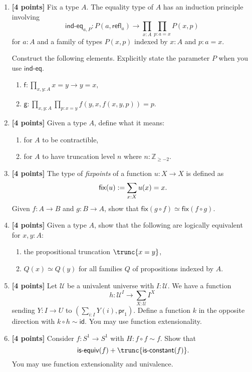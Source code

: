 \documentclass[11pt]{article}
\DeclarePairedDelimiter\trunc\lVert\rVert
\newcommand{\U}{\mathcal{U}}
\newcommand{\Z}{\mathbb{Z}}
\newcommand{\id}{\mathsf{id}}
\newcommand{\refl}{\mathsf{refl}}
\newcommand{\indeq}{\mathsf{ind\mbox{-}eq}}
\newcommand{\fst}{\mathsf{pr}_1}
\newcommand{\isEquiv}{\mathsf{is\mbox{-}equiv}}
\newcommand{\isConst}{\mathsf{is\mbox{-}constant}}
\newcommand{\fix}{\mathsf{fix}}
\begin{document}
\begin{enumerate}

\item \label{path-symmetry}
\textbf{[4 points]}
Fix a type $A$.
The equality type of $A$ has an induction principle involving
\[
\indeq_{a,P} : P(a, \refl_a) \to \prod_{x : A} \prod_{p : a = x} P(x, p)
\]
for $a : A$ and a family of types $P(x, p)$ indexed by $x : A$ and $p : a = x$.

Construct the following elements.
Explicitly state the parameter $P$ when you use $\indeq$.
\begin{enumerate}
\item \label{path-symmetry:sym}
$\displaystyle{
\mathsf{f} : \prod_{x, y : A} x = y \to y = x
},$
\item \label{path-symmetry:sym-coh}
$\displaystyle{
\mathsf{g} : \prod_{x, y : A} \prod_{p : x = y} f(y, x, f(x, y, p)) = p
}.$
\end{enumerate}

\item \label{truncation-level}
\textbf{[4 points]}
Given a type $A$, define what it means:
\begin{enumerate}
\item \label{truncation-level:contractible}
for $A$ to be contractible,
\item \label{truncation-level:general}
for $A$ to have truncation level $n$ where $n : \Z_{\geq -2}$.
\end{enumerate}

\item \label{rolling-rule}
\textbf{[4 points]}
The type of \emph{fixpoints} of a function $u : X \to X$ is defined as
\[
\fix(u) := \sum_{x:X} u(x) = x
\rlap{.}
\]
Given $f : A \to B$ and $g : B \to A$, show that $\fix(g \circ f) \simeq \fix(f \circ g)$.

\item \label{equality-proposition}
\textbf{[4 points]}
Given a type $A$, show that the following are logically equivalent for $x, y : A$:
\begin{enumerate}[label={(\arabic*)}]
\item \label{equality-proposition:truncation}
the propositional truncation $\trunc{x = y}$,
\item \label{equality-proposition:impredicative}
$Q(x) \simeq Q(y)$ for all families $Q$ of propositions indexed by $A$.
\end{enumerate}

\item \label{grothendieck-correspondence}
\textbf{[4 points]}
Let $\U$ be a univalent universe with $I : \U$.
We have a function
\[
h : \U^I \to \sum_{X : \U} I^X
\]
sending $Y : I \to U$ to $(\sum_{i:I} Y(i), \fst)$.
Define a function $k$ in the opposite direction with $k \circ h \sim \id$.
You may use function extensionality.

\item \label{circle-idempotent}
\textbf{[4 points]}
Consider $f : S^1 \to S^1$ with $H : f \circ f \sim f$.
Show that
\[
\isEquiv(f) + \trunc{\isConst(f)}
\rlap{.}
\]
You may use function extensionality and univalence.
\end{enumerate}
\end{document}
